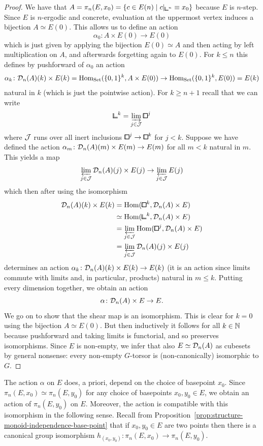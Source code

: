 \begin{proof}
We have that $A = \pi_n(E,x_0) = \{ c\in E(n) \mid c\rvert_{{\bbcor}^n} \equiv x_0 \}$ because $E$ is $n$-step.
Since $E$ is $n$-ergodic and concrete, evaluation at the uppermost vertex induces a bijection $A\simeq E(0)$.
This allows us to define an action
\[
    \alpha_0\colon A\times E(0)\to E(0)
\]
which is just given by applying the bijection $E(0)\simeq A$ and then acting by left multiplication on $A$,
and afterwards forgetting again to $E(0)$.
For $k\leq n$ this defines by pushforward of $\alpha_0$ an action
\[
    \alpha_k\colon\mathcal{D}_n(A)(k)\times E(k) = \operatorname{Hom}_{\mathrm{Set}}(\{0,1\}^k,A\times E(0)) \to \operatorname{Hom}_{\mathrm{Set}}(\{0,1\}^k,E(0)) = E(k)
\]
natural in $k$ (which is just the pointwise action).
For $k\geq n+1$ recall that we can write
\[
    {\bbcor}^k = \varinjlim_{j\in\cJ}{\bbox}^j
\]
where $\mathcal{J}$ runs over all inert inclusions ${\bbox}^j\to{\bbox}^k$ for $j<k$.
Suppose we have defined the action $\alpha_m\colon\mathcal{D}_n(A)(m)\times E(m)\to E(m)$ for all $m<k$ natural in $m$.
This yields a map
\[
    \varprojlim_{j\in\mathcal{J}}\mathcal{D}_n(A)(j)\times E(j) \to \varprojlim_{j\in\mathcal{J}} E(j)
\]
which then after using the isomorphism
\begin{align*}
    \cD_n(A)(k)\times E(k)
    &= \hom({\bbox}^k,\cD_n(A)\times E) \\
    &\simeq \hom({\bbcor}^k,\cD_n(A)\times E) \\
    &= \varprojlim_{j\in\cJ}\hom({\bbox}^j,\cD_n(A)\times E) \\
    &= \varprojlim_{j\in\cJ}\cD_n(A)(j)\times E(j)
\end{align*}
determines an action $\alpha_k\colon\mathcal{D}_n(A)(k)\times E(k)\to E(k)$
(it is an action since limits commute with limits and, in particular, products) natural in $m\leq k$.
Putting every dimension together, we obtain an action
\[
    \alpha\colon\mathcal{D}_n(A)\times E\to E.
\]
We go on to show that the shear map is an isomorphism.
This is clear for $k = 0$ using the bijection $A\simeq E(0)$.
But then inductively it follows for all $k\in{\mathbb{N}}$
because pushforward and taking limits is functorial, and so preserves isomorphisms.
Since $E$ is non-empty, we infer that also $E\simeq\mathcal{D}_n(A)$ as cubesets by general nonsense:
every non-empty $G$-torsor is (non-canonically) isomorphic to $G$.
\end{proof}

The action $\alpha$ on $E$ does, a priori, depend on the choice of basepoint $x_0$.
Since $\pi_n(E,x_0)\simeq\pi_n(E,y_0)$ for any choice of basepoints $x_0,y_0\in E$,
we obtain an action of $\pi_n(E,y_0)$ on $E$.
Moreover, the action is compatible with this isomorphism in the following sense.
Recall from Proposition~\ref{prop:structure-monoid-independence-base-point}
that if $x_0,y_0\in E$ are two points then there is a canonical group isomorphism
$h_{(x_0,y_0)}\colon\pi_n(E,x_0)\to\pi_n(E,y_0)$.

